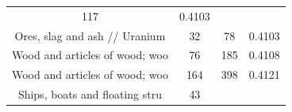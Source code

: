 \documentclass[10pt,]{article}
\begin{document}
\begin{longtable}[]{@{}cccc@{}}
\begin{minipage}[t]{0.20\columnwidth}
117\strut
\end{minipage} & \begin{minipage}[t]{0.09\columnwidth}\centering\strut
0.4103\strut
\end{minipage}\tabularnewline
\begin{minipage}[t]{0.38\columnwidth}\centering\strut
Ores, slag and ash // Uranium\strut
\end{minipage} & \begin{minipage}[t]{0.21\columnwidth}\centering\strut
32\strut
\end{minipage} & \begin{minipage}[t]{0.20\columnwidth}\centering\strut
78\strut
\end{minipage} & \begin{minipage}[t]{0.09\columnwidth}\centering\strut
0.4103\strut
\end{minipage}\tabularnewline
\begin{minipage}[t]{0.38\columnwidth}\centering\strut
Wood and articles of wood; woo\strut
\end{minipage} & \begin{minipage}[t]{0.21\columnwidth}\centering\strut
76\strut
\end{minipage} & \begin{minipage}[t]{0.20\columnwidth}\centering\strut
185\strut
\end{minipage} & \begin{minipage}[t]{0.09\columnwidth}\centering\strut
0.4108\strut
\end{minipage}\tabularnewline
\begin{minipage}[t]{0.38\columnwidth}\centering\strut
Wood and articles of wood; woo\strut
\end{minipage} & \begin{minipage}[t]{0.21\columnwidth}\centering\strut
164\strut
\end{minipage} & \begin{minipage}[t]{0.20\columnwidth}\centering\strut
398\strut
\end{minipage} & \begin{minipage}[t]{0.09\columnwidth}\centering\strut
0.4121\strut
\end{minipage}\tabularnewline
\begin{minipage}[t]{0.38\columnwidth}\centering\strut
Ships, boats and floating stru\strut
\end{minipage} & \begin{minipage}[t]{0.21\columnwidth}\centering\strut
43\strut
\end{minipage} & \begin{minipage}[t]{0.20\columnwidth}\centering\strut

\end{minipage}
\end{longtable}
\end{document}
